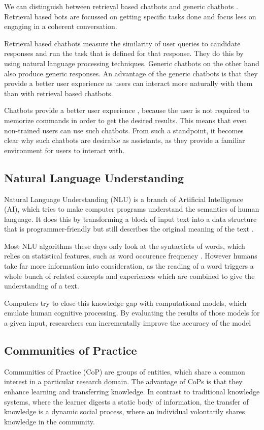 We can distinguish between retrieval based chatbots and generic chatbots \cite{NLKl19,WWX*16}. Retrieval based bots are focussed on getting specific tasks done and focus less on engaging in a coherent conversation.

Retrieval based chatbots measure the similarity of user queries to candidate responses and run the task that is defined for that response. They do this by using natural language processing techniques. Generic chatbots on the other hand also produce generic responses. An advantage of the generic chatbots is that they provide a better user experience as users can interact more naturally with them than with retrieval based chatbots.

Chatbots provide a better user experience \cite{CHW*17}, because the user is not required to memorize commands in order to get the desired results. This means that even non-trained users can use such chatbots. From such a standpoint, it becomes clear why such chatbots are desirable as assistants, as they provide a familiar environment for users to interact with.

\subsection{Natural Language Understanding}
Natural Language Understanding (NLU) is a branch of Artificial Intelligence (AI), which tries to make computer programs understand the semantics of human language. It does this by transforming a block of input text into a data structure that is programmer-friendly but still describes the original meaning of the text \cite{CWB*11}.

Most NLU algorithms these days only look at the syntacticts of words, which relies on statistical features, such as word occurence frequency \cite{CaWh14}. However humans take far more information into consideration, as the reading of a word triggers a whole bunch of related concepts and experiences which are combined to give the understanding of a text.

Computers try to close this knowledge gap with computational models, which emulate human cognitive processing. By evaluating the results of those models for a given input, researchers can incrementally improve the accuracy of the model \cite{CaWh14}


\subsection{Communities of Practice}
Communities of Practice (CoP) are groups of entities, which share a common interest in a particular research domain\cite{Weng98}. The advantage of CoPs is that they enhance learning and transferring knowledge. In contrast to traditional knowledge systems, where the learner digests a static body of information, the transfer of knowledge is a dynamic social process, where an individual volontarily shares knowledge in the community\cite{AMMi15,Kern08}.

